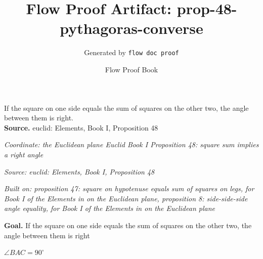 \documentclass[11pt]{article}
\title{Flow Proof Artifact: prop-48-pythagoras-converse}
\author{Generated by \texttt{flow doc proof}}
\date{Flow Proof Book}
\theoremstyle{definition}
\begin{document}
\maketitle
If the square on one side equals the sum of squares on the other two, the angle between them is right.\\[0.5em]
\textbf{Source.} euclid: Elements, Book I, Proposition 48\\[0.5em]
\bigskip
{}\par
\smallskip\noindent\textit{Coordinate: the Euclidean plane \cdot Euclid Book I \cdot Proposition 48: square sum implies a right angle}\par
\smallskip\noindent\textit{Source: euclid: Elements, Book I, Proposition 48}\par
\smallskip\noindent\textit{Built on: proposition 47: square on hypotenuse equals sum of squares on legs, for Book I of the Elements in on the Euclidean plane, proposition 8: side-side-side angle equality, for Book I of the Elements in on the Euclidean plane}\par
\medskip
\noindent\textbf{Goal.} If the square on one side equals the sum of squares on the other two, the angle between them is right\par
\noindent$\displaystyle \angle BAC = 90^\circ$\par
\medskip
\noindent
\end{document}

